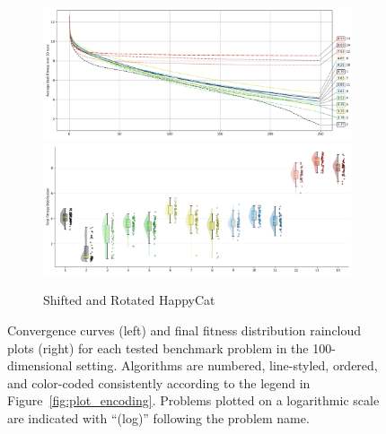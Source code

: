 \begin{figure}[p]
\begin{subfigure}{1\textwidth}
    \centering
    \includegraphics[width=.49\textwidth]{Figures/results/100/Shifted_and_Rotated_HappyCat_All_selected_algorithms_dim100_annot_legend.png}
    \includegraphics[width=.49\textwidth]{Figures/results/100/Shifted_and_Rotated_HappyCat_all_dim100_raincloud_vertical.png}
    \caption{Shifted and Rotated HappyCat}
\end{subfigure}

\enlargethispage{1\baselineskip}
\captionsetup{list=no}
\caption[Convergence curves and final fitness distribution raincloud plots for 100-dimensional problems]{Convergence curves (left) and final fitness distribution raincloud plots (right) for each tested benchmark problem in the 100-dimensional setting. Algorithms are numbered, line-styled, ordered, and color-coded consistently according to the legend in Figure~\ref{fig:plot_encoding}. Problems plotted on a logarithmic scale are indicated with ``(log)'' following the problem name.}
\end{figure}




